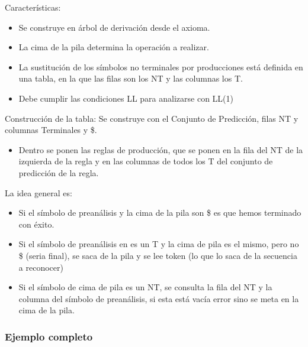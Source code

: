 \documentclass[12pt]{report} %
\begin{document}
Características:

\begin{itemize}

\item
  Se construye en árbol de derivación desde el axioma.
\item
  La cima de la pila determina la operación a realizar.
\item
  La sustitución de los símbolos no terminales por producciones está
  definida en una tabla, en la que las filas son los NT y las columnas
  los T.
\item
  Debe cumplir las condiciones LL para analizarse con LL(1)
\end{itemize}

Construcción de la tabla: Se construye con el Conjunto de Predicción,
filas NT y columnas Terminales y \$.

\begin{itemize}

\item
  Dentro se ponen las reglas de producción, que se ponen en la fila del
  NT de la izquierda de la regla y en las columnas de todos los T del
  conjunto de predicción de la regla.
\end{itemize}

La idea general es:

\begin{itemize}

\item
  Si el símbolo de preanálisis y la cima de la pila son \$ es que hemos
  terminado con éxito.
\item
  Si el símbolo de preanálisis en es un T y la cima de pila es el mismo,
  pero no \$ (seria final), se saca de la pila y se lee token (lo que lo
  saca de la secuencia a reconocer)
\item
  Si el símbolo de cima de pila es un NT, se consulta la fila del NT y
  la columna del símbolo de preanálisis, si esta está vacía error sino
  se meta en la cima de la pila.
\end{itemize}

\pagebreak

\subsubsection{Ejemplo completo}
\end{document}
